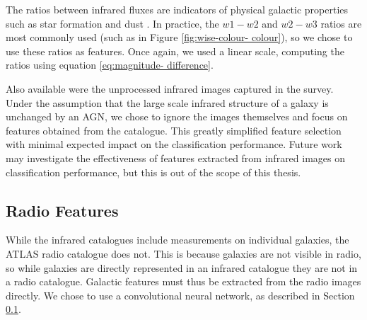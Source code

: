     The ratios between infrared fluxes are indicators of physical galactic
    properties such as star formation and dust . In practice, the $w1 - w2$ and $w2 - w3$
    ratios are most commonly used (such as in Figure \ref{fig:wise-colour-
    colour}), so we chose to use these ratios as features. Once again, we used
    a linear scale, computing the ratios using equation \ref{eq:magnitude-
    difference}.

    Also available were the unprocessed infrared images captured in the survey.
    Under the assumption that the large scale infrared structure of a galaxy is
    unchanged by an AGN, we chose to ignore the images themselves and focus on
    features obtained from the catalogue. This greatly simplified feature
    selection with minimal expected impact on the classification performance.
    Future work may investigate the effectiveness of features extracted from
    infrared images on classification performance, but this is out of the scope
    of this thesis.




  \subsection{Radio Features}
  \label{sec:image-features}

    While the infrared catalogues include measurements on individual galaxies,
    the ATLAS radio catalogue does not. This is because galaxies are not
    visible in radio, so while galaxies are directly represented in an infrared
    catalogue they are not in a radio catalogue. Galactic features must thus be
    extracted from the radio images directly. We chose to use a convolutional
    neural network, as described in Section \ref{sec:image-features}.

